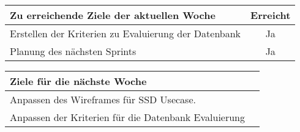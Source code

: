 \begin{tabularx}{\textwidth}{Xc}
    \arrayrulecolor{OliveGreen}
    \toprule
    {\bfseries Zu erreichende Ziele der aktuellen Woche} & {\bfseries Erreicht} \\
    \midrule[2pt]
    Erstellen der Kriterien zu Evaluierung der Datenbank  &Ja                    \\
    \rowcolor{OliveGreen!15}
    Planung des nächsten Sprints                          &Ja                    \\
    
    \bottomrule[2pt]
\end{tabularx}
%
\vspace{1cm}
%
\begin{tabularx}{\textwidth}{Xc}
    \arrayrulecolor{OliveGreen}
    \toprule
    {\bfseries Ziele für die nächste Woche}              &                      \\
    \midrule[2pt]
    Anpassen des Wireframes für SSD  Usecase.            &                      \\
    \rowcolor{OliveGreen!15}
    Anpassen der Kriterien für die Datenbank Evaluierung &                      \\
\end{tabularx}
